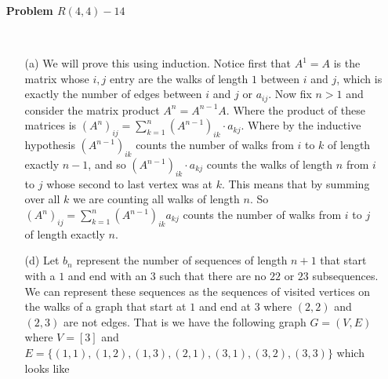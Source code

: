 \documentclass[12pt]{amsart}
\theoremstyle{definition}
\begin{document}
\begin{itemize}[align=left]
    \item[\textbf{Problem $R(4,4)-14$}] %
    \iffalse\begin{tikzpicture}
    
    \begin{scope}[every node/.style={scale=.8}]
    \node (A) at (0,0) {1};
    \node (B) at (0,10mm) {2};
    \node (C) at (10mm,10mm) {3};
    \node (D) at (10mm,0) {4};
    \end{scope}

    \begin{scope}[>={Stealth[black]},
              every edge/.style={draw=black, thin}]. %
    \path [-] (A) edge (B);
    \path [-] (B) edge (C);
    \path [-] (C) edge (D);
    \path [-] (A) edge (D);
    \path [-] (A) edge (C);
    \end{scope}

    \end{tikzpicture}
    \fi
    \;\\
    \begin{itemize}
        \item[(a)] %
        We will prove this using induction. Notice first that $A^1=A$ is the matrix whose $i,j$ entry are the walks of length $1$ between $i$ and $j$, which is exactly the number of edges between $i$ and $j$ or $a_{ij}$. Now fix $n>1$ and consider the matrix product $A^n=A^{n-1}A$. Where the product of these matrices is $(A^n)_{ij}=\sum_{k=1}^{n}(A^{n-1})_{ik}\cdot a_{kj}$. Where by the inductive hypothesis $(A^{n-1})_{ik}$ counts the number of walks from $i$ to $k$ of length exactly $n-1$, and so $(A^{n-1})_{ik}\cdot a_{kj}$ counts the walks of length $n$ from $i$ to $j$ whose second to last vertex was at $k$. This means that by summing over all $k$ we are counting all walks of length $n$. So $(A^n)_{ij}=\sum_{k=1}^{n}(A^{n-1})_{ik}a_{kj}$ counts the number of walks from $i$ to $j$ of length exactly $n$.\\
        
        \item[(d)] %
         Let $b_n$ represent the number of sequences of length $n+1$ that start with a $1$ and end with an $3$ such that there are no $22$ or $23$ subsequences. We can represent these sequences as the sequences of visited vertices on the walks of a graph that start at $1$ and end at $3$ where $(2,2)$ and $(2,3)$ are not edges. That is we have the following graph $G=(V,E)$ where $V=[3]$ and $E=\{(1,1),(1,2),(1,3),(2,1),(3,1),(3,2),(3,3)\}$ which looks like


\end{itemize}
\end{itemize}
\end{document}

